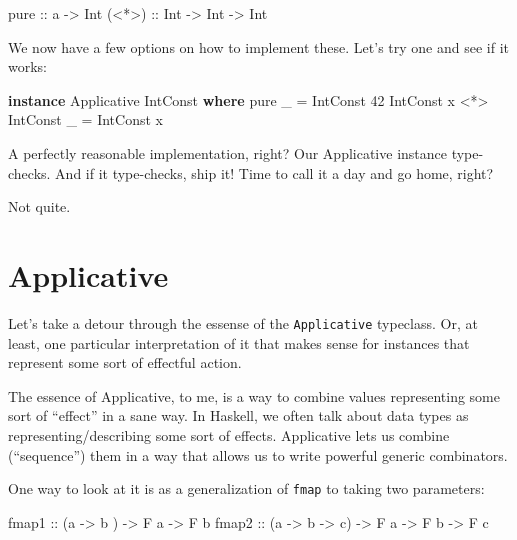 \documentclass[]{article}
\newenvironment{Shaded}{}{}
\newcommand{\DataTypeTok}[1]{\textcolor[rgb]{0.56,0.13,0.00}{#1}}
\newcommand{\DecValTok}[1]{\textcolor[rgb]{0.25,0.63,0.44}{#1}}
\newcommand{\FunctionTok}[1]{\textcolor[rgb]{0.02,0.16,0.49}{#1}}
\newcommand{\KeywordTok}[1]{\textcolor[rgb]{0.00,0.44,0.13}{\textbf{#1}}}
\newcommand{\NormalTok}[1]{#1}
\newcommand{\OperatorTok}[1]{\textcolor[rgb]{0.40,0.40,0.40}{#1}}
\newcommand{\OtherTok}[1]{\textcolor[rgb]{0.00,0.44,0.13}{#1}}
\begin{document}
\begin{Shaded}
\begin{Highlighting}[]
\FunctionTok{pure}\OtherTok{  ::}\NormalTok{ a }\OtherTok{{-}>} \DataTypeTok{Int}
\OtherTok{(<*>) ::} \DataTypeTok{Int} \OtherTok{{-}>} \DataTypeTok{Int} \OtherTok{{-}>} \DataTypeTok{Int}
\end{Highlighting}
\end{Shaded}

We now have a few options on how to implement these. Let's try one and see if it
works:

\begin{Shaded}
\begin{Highlighting}[]
\KeywordTok{instance} \DataTypeTok{Applicative} \DataTypeTok{IntConst} \KeywordTok{where}
    \FunctionTok{pure}\NormalTok{ \_                    }\OtherTok{=} \DataTypeTok{IntConst} \DecValTok{42}
    \DataTypeTok{IntConst}\NormalTok{ x }\OperatorTok{<*>} \DataTypeTok{IntConst}\NormalTok{ \_ }\OtherTok{=} \DataTypeTok{IntConst}\NormalTok{ x}
\end{Highlighting}
\end{Shaded}

A perfectly reasonable implementation, right? Our Applicative instance
type-checks. And if it type-checks, ship it! Time to call it a day and go home,
right?

Not quite.

\hypertarget{applicative}{%
\section{Applicative}\label{applicative}}

Let's take a detour through the essense of the \texttt{Applicative} typeclass.
Or, at least, one particular interpretation of it that makes sense for instances
that represent some sort of effectful action.

The essence of Applicative, to me, is a way to combine values representing some
sort of ``effect'' in a sane way. In Haskell, we often talk about data types as
representing/describing some sort of effects. Applicative lets us combine
(``sequence'') them in a way that allows us to write powerful generic
combinators.

One way to look at it is as a generalization of \texttt{fmap} to taking two
parameters:

\begin{Shaded}
\begin{Highlighting}[]
\OtherTok{fmap1 ::}\NormalTok{ (a }\OtherTok{{-}>}\NormalTok{ b     ) }\OtherTok{{-}>} \DataTypeTok{F}\NormalTok{ a }\OtherTok{{-}>} \DataTypeTok{F}\NormalTok{ b}
\OtherTok{fmap2 ::}\NormalTok{ (a }\OtherTok{{-}>}\NormalTok{ b }\OtherTok{{-}>}\NormalTok{ c) }\OtherTok{{-}>} \DataTypeTok{F}\NormalTok{ a }\OtherTok{{-}>} \DataTypeTok{F}\NormalTok{ b }\OtherTok{{-}>} \DataTypeTok{F}\NormalTok{ c}
\end{Highlighting}
\end{Shaded}
\end{document}
